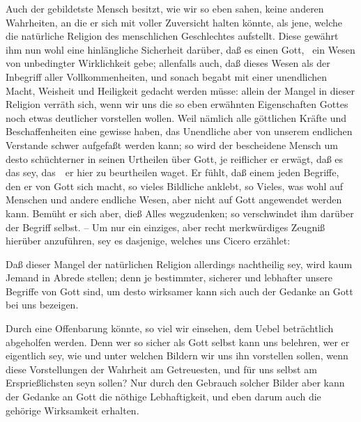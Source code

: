 \begin{aufza}
\item  Auch der gebildetste Mensch besitzt, wie wir so eben sahen, keine anderen Wahrheiten, an die er sich mit voller Zuversicht halten könnte, als jene, welche die natürliche Religion des menschlichen Geschlechtes aufstellt. Diese gewährt ihm nun wohl eine hinlängliche Sicherheit darüber, daß es einen Gott, \dh\ ein Wesen von unbedingter Wirklichkeit gebe; allenfalls auch, daß dieses Wesen als der Inbegriff aller Vollkommenheiten, und sonach begabt mit einer unendlichen Macht, Weisheit und Heiligkeit gedacht werden müsse: allein der  Mangel in dieser Religion verräth sich, wenn wir uns die so eben erwähnten Eigenschaften Gottes noch etwas deutlicher vorstellen wollen. Weil nämlich alle göttlichen Kräfte und Beschaffenheiten eine gewisse  haben, das Unendliche aber von unserem endlichen Verstande schwer aufgefaßt werden kann; so wird der bescheidene Mensch um desto schüchterner in seinen Urtheilen über Gott, je reiflicher er erwägt, daß es das  sey, das~\ er hier zu beurtheilen waget. Er fühlt, daß einem jeden Begriffe, den er von Gott sich macht, so vieles Bildliche anklebt, so Vieles, was wohl auf Menschen und andere endliche Wesen, aber nicht auf Gott angewendet werden kann. Bemüht er sich aber, dieß Alles wegzudenken; so verschwindet ihm darüber der Begriff selbst. -- Um nur ein einziges, aber recht merkwürdiges Zeugniß hierüber anzuführen, sey es dasjenige, welches uns Cicero  erzählet: 
\item Daß dieser Mangel der natürlichen Religion allerdings nachtheilig sey, wird kaum Jemand in Abrede stellen; denn je bestimmter, sicherer und lebhafter unsere Begriffe von Gott sind, um desto wirksamer kann sich auch der Gedanke an Gott bei uns bezeigen.
\item Durch eine Offenbarung könnte, so viel wir einsehen, dem Uebel beträchtlich abgeholfen werden. Denn wer so sicher als Gott selbst kann uns belehren, wer er eigentlich sey, wie und unter welchen Bildern wir uns ihn vorstellen sollen, wenn diese Vorstellungen der Wahrheit am Getreuesten, und für uns selbst am Ersprießlichsten seyn sollen? Nur durch den Gebrauch solcher Bilder aber kann der Gedanke an Gott die nöthige Lebhaftigkeit, und eben darum auch die gehörige Wirksamkeit erhalten.

\end{aufza}
